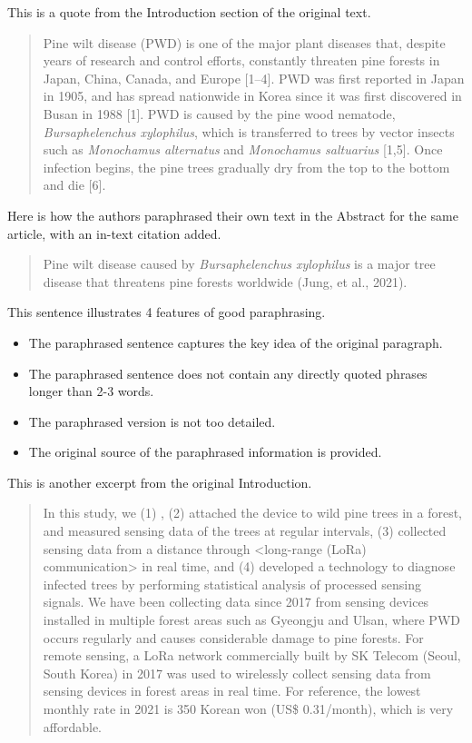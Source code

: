 \documentclass[
]{book}
\providecommand{\tightlist}{%
  \setlength{\itemsep}{0pt}\setlength{\parskip}{0pt}}
\begin{document}
This is a quote from the Introduction section of the original text.

\begin{quote}
Pine wilt disease (PWD) is one of the major plant diseases that, despite years of research and control efforts, constantly threaten pine forests in Japan, China, Canada, and Europe {[}1--4{]}. PWD was first reported in Japan in 1905, and has spread nationwide in Korea since it was first discovered in Busan in 1988 {[}1{]}. PWD is caused by the pine wood nematode, \emph{Bursaphelenchus xylophilus}, which is transferred to trees by vector insects such as \emph{Monochamus alternatus} and \emph{Monochamus saltuarius} {[}1,5{]}. Once infection begins, the pine trees gradually dry from the top to the bottom and die {[}6{]}.
\end{quote}

Here is how the authors paraphrased their own text in the Abstract for the same article, with an in-text citation added.

\begin{quote}
Pine wilt disease caused by \emph{Bursaphelenchus xylophilus} is a major tree disease that threatens pine forests worldwide (Jung, et al., 2021).
\end{quote}

This sentence illustrates 4 features of good paraphrasing.

\begin{itemize}
\tightlist
\item
  The paraphrased sentence captures the key idea of the original paragraph.
\item
  The paraphrased sentence does not contain any directly quoted phrases longer than 2-3 words.
\item
  The paraphrased version is not too detailed.
\item
  The original source of the paraphrased information is provided.
\end{itemize}

This is another excerpt from the original Introduction.

\begin{quote}
In this study, we (1) , (2) attached the device to wild pine trees in a forest, and measured sensing data of the trees at regular intervals, (3) collected sensing data from a distance through \textless long-range (LoRa) communication\textgreater{} in real time, and (4) developed a technology to diagnose infected trees by performing statistical analysis of processed sensing signals. We have been collecting data since 2017 from sensing devices installed in multiple forest areas such as Gyeongju and Ulsan, where PWD occurs regularly and causes considerable damage to pine forests. For remote sensing, a LoRa network commercially built by SK Telecom (Seoul, South Korea) in 2017 was used to wirelessly collect sensing data from sensing devices in forest areas in real time. For reference, the lowest monthly rate in 2021 is 350 Korean won (US\$ 0.31/month), which is very affordable.
\end{quote}
\end{document}
